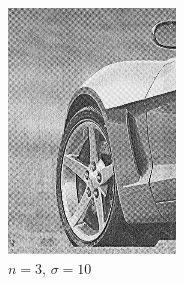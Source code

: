 \documentclass[
	12pt, %
]{style/fphw}
\begin{document}
\begin{figure}[H]
\begin{subfigure}[b]{.22\textwidth}
             \includegraphics[width=\textwidth]{Q5_3_2_10.png}
             \caption{$n=3$, $\sigma=10$}
             \label{Q5_3_3_10}
         \end{subfigure}
         \hfill
         \begin{subfigure}[b]{.22\textwidth}
             \centering

\end{subfigure}
\end{figure}
\end{document}
